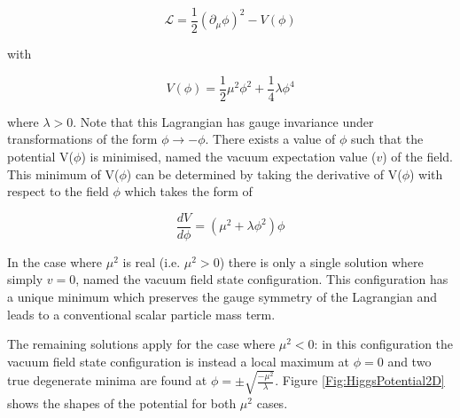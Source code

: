 \documentclass[12pt,a4paper,epsf,portrait,times,epsfig]{report}
\begin{document}
	\begin{equation}
		\mathcal{L} = \frac{1}{2}(\partial_{\mu}\phi)^{2}-V(\phi)
	\end{equation}

	with

	\begin{equation} \label{eq:HiggsPotentialGlobal}
		V(\phi) = \frac{1}{2}\mu^{2}\phi^{2} + \frac{1}{4}\lambda\phi^{4}
	\end{equation}

	where $\lambda > 0$. Note that this Lagrangian has gauge invariance under transformations of the form $\phi \rightarrow -\phi$. There exists a value of $\phi$ such that the potential V($\phi$) is minimised, named the vacuum expectation value ($v$) of the field. This minimum of V($\phi$) can be determined by taking the derivative of V($\phi$) with respect to the field $\phi$ which takes the form of

	\begin{equation}
		\frac{dV}{d\phi}=(\mu^{2} + \lambda\phi^{2})\phi
	\end{equation}

	In the case where $\mu^{2}$ is real (i.e. $\mu^{2} > 0$) there is only a single solution where simply $v = 0$, named the vacuum field state configuration. This configuration has a unique minimum which preserves the gauge symmetry of the Lagrangian and leads to a conventional scalar particle mass term. \par

	The remaining solutions apply for the case where $\mu^{2} < 0$: in this configuration the vacuum field state configuration is instead a local maximum at $\phi = 0$ and two true degenerate minima are found at $\phi = \pm \sqrt{\frac{-\mu^{2}}{\lambda}}$. Figure \ref{Fig:HiggsPotential2D} shows the shapes of the potential for both $\mu^2$ cases.  
\end{document}

